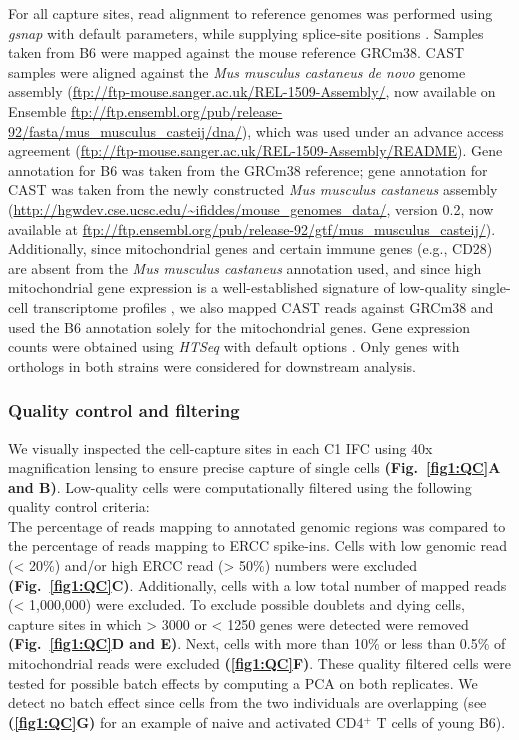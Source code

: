 For all capture sites, read alignment to reference genomes was performed using \emph{gsnap} with default parameters, while supplying splice-site positions \citep{Wu2010a}. Samples taken from B6 were mapped against the mouse reference GRCm38. CAST samples were aligned against the \emph{Mus musculus castaneus de novo} genome assembly (\url{ftp://ftp-mouse.sanger.ac.uk/REL-1509-Assembly/}, now available on Ensemble \url{ftp://ftp.ensembl.org/pub/release-92/fasta/mus_musculus_casteij/dna/}), which was used under an advance access agreement (\url{ftp://ftp-mouse.sanger.ac.uk/REL-1509-Assembly/README}). Gene annotation for B6 was taken from the GRCm38 reference; gene annotation for CAST was taken from the newly constructed \emph{Mus musculus castaneus} assembly (\url{http://hgwdev.cse.ucsc.edu/~ifiddes/mouse_genomes_data/}, version 0.2, now available at \url{ftp://ftp.ensembl.org/pub/release-92/gtf/mus_musculus_casteij/}). Additionally, since mitochondrial genes and certain immune genes (e.g., CD28) are absent from the \emph{Mus musculus castaneus} annotation used, and since high mitochondrial gene expression is a well-established signature of low-quality single-cell transcriptome profiles \citep{Ilicic2016}, we also mapped CAST reads against GRCm38 and used the B6 annotation solely for the mitochondrial genes. Gene expression counts were obtained using \emph{HTSeq} with default options \citep{Anders2014}. Only genes with orthologs in both strains were considered for downstream analysis. 

\subsubsection{Quality control and filtering}

We visually inspected the cell-capture sites in each C1 IFC using 40x magnification lensing to ensure precise capture of single cells \textbf{(Fig.~\ref{fig1:QC}A and B)}. Low-quality cells were computationally filtered using the following quality control criteria:\\
The percentage of reads mapping to annotated genomic regions was compared to the percentage of reads mapping to ERCC spike-ins. Cells with low genomic read (< 20\%) and/or high ERCC read (> 50\%) numbers were excluded \textbf{(Fig.~\ref{fig1:QC}C)}. Additionally, cells with  a low total number of mapped reads (< 1,000,000) were excluded. To exclude possible doublets and dying cells, capture sites in which > 3000 or < 1250 genes were detected were removed \textbf{(Fig.~\ref{fig1:QC}D and E)}. Next, cells with more than 10\% or less than 0.5\% of mitochondrial reads were excluded \textbf{(\ref{fig1:QC}F)}. These quality filtered cells were tested for possible batch effects by computing a PCA on both replicates. We detect no batch effect since cells from the two individuals are overlapping (see \textbf{(\ref{fig1:QC}G)} for an example of naive and activated CD4$^+$ T cells of young B6).\\

